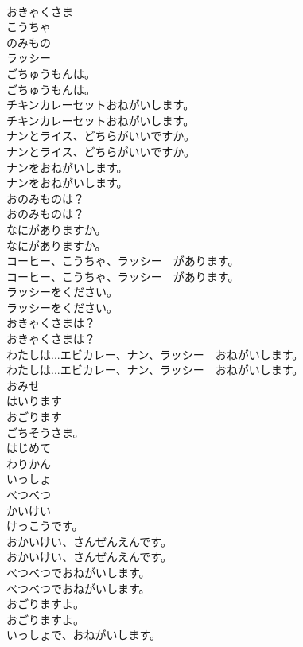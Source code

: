 \documentclass[8pt]{extreport}
\begin{document}
\begin{CJK}{UTF8}{min}
\\	おきゃくさま
\\	こうちゃ
\\	のみもの
\\	ラッシー
\\	ごちゅうもんは。	
\\	ごちゅうもんは。 
\\	チキンカレーセットおねがいします。	
\\	チキンカレーセットおねがいします。 
\\	ナンとライス、どちらがいいですか。	
\\	ナンとライス、どちらがいいですか。 
\\	ナンをおねがいします。	
\\	ナンをおねがいします。 
\\	おのみものは？	
\\	おのみものは？ 
\\	なにがありますか。	
\\	なにがありますか。 
\\	コーヒー、こうちゃ、ラッシー　があります。	
\\	コーヒー、こうちゃ、ラッシー　があります。 
\\	ラッシーをください。	
\\	ラッシーをください。 
\\	おきゃくさまは？	
\\	おきゃくさまは？ 
\\	わたしは...エビカレー、ナン、ラッシー　おねがいします。	
\\	わたしは...エビカレー、ナン、ラッシー　おねがいします。 
\\	おみせ
\\	はいります
\\	おごります
\\	ごちそうさま。
\\	はじめて
\\	わりかん
\\	いっしょ
\\	べつべつ
\\	かいけい
\\	けっこうです。
\\	おかいけい、さんぜんえんです。	
\\	おかいけい、さんぜんえんです。 
\\	べつべつでおねがいします。	
\\	べつべつでおねがいします。 
\\	おごりますよ。	
\\	おごりますよ。 
\\	いっしょで、おねがいします。	

\end{CJK}
\end{document}
